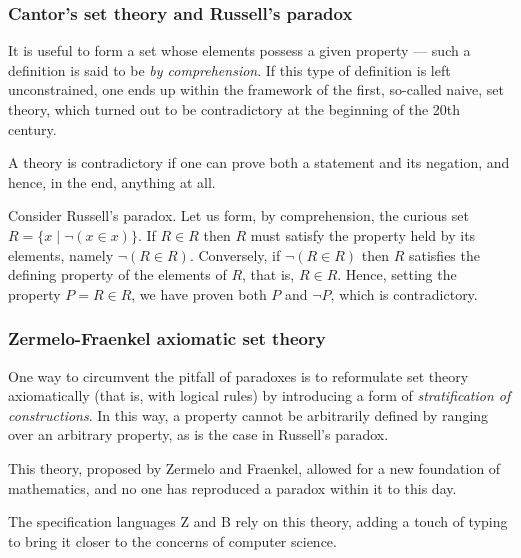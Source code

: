 \documentclass[compress,dvipdfmx]{beamer}
\begin{document}
%
\begin{frame}
\frametitle{Cantor's set theory and Russell's paradox}

It is useful to form a set whose elements possess a given
property --- such a definition is said to be \emph{by
  comprehension}. If this type of definition is left unconstrained,
one ends up within the framework of the first, so-called naive, set
theory, which turned out to be contradictory at the beginning of the
20th century.

\bigskip

A theory is contradictory if one can prove both a statement and its
negation, and hence, in the end, anything at all.

\bigskip

Consider Russell's paradox. Let us form, by comprehension, the
curious set $R = \{x \mid \neg(x \in x)\}$. If $R \in R$ then $R$
must satisfy the property held by its elements, namely $\neg(R \in
R)$. Conversely, if $\neg(R \in R)$ then $R$ satisfies the defining
property of the elements of $R$, that is, $R \in R$. Hence, setting
the property $P = R \in R$, we have proven both $P$ and $\neg{P}$,
which is contradictory.

\end{frame}

%
\begin{frame}
\frametitle{Zermelo-Fraenkel axiomatic set theory}

One way to circumvent the pitfall of paradoxes is to reformulate set
theory axiomatically (that is, with logical rules) by introducing a
form of \emph{stratification of constructions}. In this way, a
property cannot be arbitrarily defined by ranging over an arbitrary
property, as is the case in Russell's paradox.

\bigskip

This theory, proposed by Zermelo and Fraenkel, allowed for a
new foundation of mathematics, and no one has reproduced a paradox
within it to this day.

\bigskip

The specification languages \textsf{Z} and \textsf{B} rely on this
theory, adding a touch of typing to bring it closer to the concerns
of computer science.

\end{frame}
\end{document}
